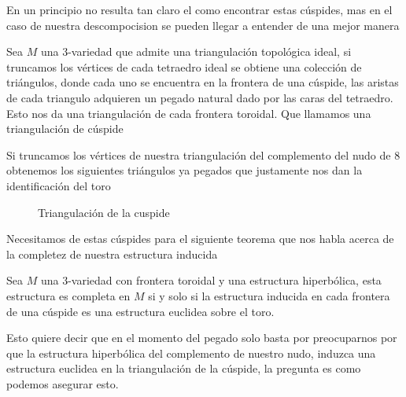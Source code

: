 En un principio no resulta tan claro el como encontrar estas cúspides, mas en el caso de nuestra descompocision se pueden llegar a entender de una mejor manera

\begin{definition}
    Sea $M$ una 3-variedad que admite una triangulación topológica ideal, si truncamos los vértices de cada tetraedro ideal se obtiene una colección de triángulos, donde cada uno  se encuentra en la frontera de una cúspide, las aristas de cada triangulo adquieren un pegado natural dado por las caras del tetraedro. Esto nos da una triangulación de cada frontera toroidal. Que llamamos una triangulación de cúspide
\end{definition}

\begin{eg}
    Si truncamos los vértices de nuestra triangulación del complemento del nudo de $8$ obtenemos los siguientes triángulos ya pegados que justamente nos dan la identificación del toro
    \begin{figure}[H]
    \centering
    
        \caption{Triangulación de la cuspide}
    
    \end{figure}
\end{eg}

Necesitamos de estas cúspides para el siguiente teorema que nos habla acerca de la completez de nuestra estructura inducida

\begin{theorem}
    Sea $M$ una 3-variedad con frontera toroidal y una estructura hiperbólica, esta estructura es completa en $M$ si y solo si la estructura inducida en cada frontera de una cúspide es una estructura euclidea sobre el toro.
\end{theorem}

Esto quiere decir que en el momento del pegado solo basta por preocuparnos por que la estructura hiperbólica del complemento de nuestro nudo, induzca una estructura euclidea en la triangulación de la cúspide, la pregunta es como podemos asegurar esto.

